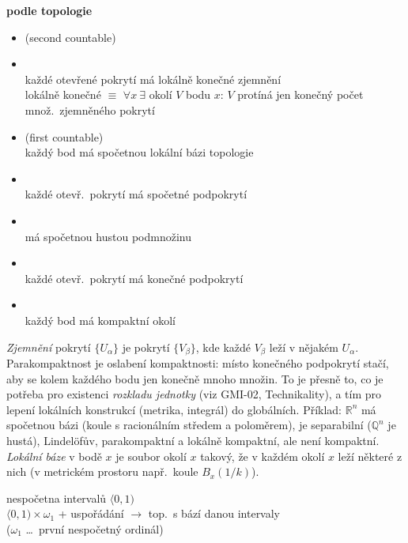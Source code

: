 \textbf{podle  topologie}
\begin{itemize}
  \item {} (second countable)
  \item {} \\
        každé otevřené pokrytí má lokálně konečné zjemnění \\
        lokálně konečné $\equiv$ $\forall x\ \exists$ okolí $V$ bodu $x$: $V$ protíná jen konečný počet množ.\ zjemněného pokrytí
  \item {} (first countable) \\
        každý bod má spočetnou lokální bázi topologie
  \item {} \\
        každé otevř.\ pokrytí má spočetné podpokrytí
  \item {} \\
        má spočetnou hustou podmnožinu
  \item {} \\
        každé otevř.\ pokrytí má konečné podpokrytí
  \item {} \\
        každý bod má kompaktní okolí
\end{itemize}

\begin{vysvetleni}
\emph{Zjemnění} pokrytí $\{U_\alpha\}$ je pokrytí $\{V_\beta\}$, kde každé $V_\beta$ leží v nějakém $U_\alpha$. Parakompaktnost je oslabení kompaktnosti: místo konečného podpokrytí stačí, aby se kolem každého bodu  jen konečně mnoho množin. To je přesně to, co je potřeba pro existenci \emph{rozkladu jednotky} (viz GMI-02, Technikality), a tím pro lepení lokálních konstrukcí (metrika, integrál) do globálních.
Příklad: $\mathbb{R}^n$ má spočetnou bázi (koule s racionálním středem a poloměrem), je separabilní ($\mathbb{Q}^n$ je hustá), Lindelöfův, parakompaktní a lokálně kompaktní, ale není kompaktní.
\emph{Lokální báze} v bodě $x$ je soubor okolí $x$ takový, že v každém okolí $x$ leží některé z nich (v metrickém prostoru např.\ koule $B_x(1/k)$).
\end{vysvetleni}

\begin{priklad}[Př: neparakompaktní pr.\ = \uv{dlouhá} polopřímka]
 nespočetna intervalů $\langle 0,1)$ \\
$\langle 0,1)\times\omega_1$ + uspořádání $\to$ top.\ s bází danou intervaly \\
\quad ($\omega_1$ \dots\ první nespočetný ordinál)
\end{priklad}

